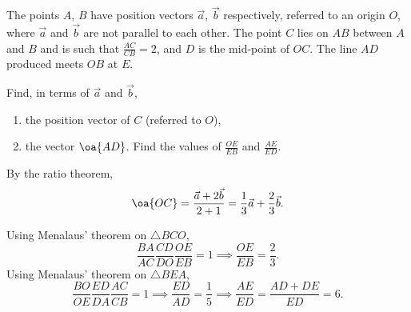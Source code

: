 \begin{problem}
    The points $A$, $B$ have position vectors $\vec a$, $\vec b$ respectively, referred to an origin $O$, where $\vec a$ and $\vec b$ are not parallel to each other. The point $C$ lies on $AB$ between $A$ and $B$ and is such that $\frac{AC}{CB} = 2$, and $D$ is the mid-point of $OC$. The line $AD$ produced meets $OB$ at $E$.

    Find, in terms of $\vec a$ and $\vec b$,

    \begin{enumerate}
        \item the position vector of $C$ (referred to $O$),
        \item the vector $\oa{AD}$. Find the values of $\frac{OE}{EB}$ and $\frac{AE}{ED}$.
    \end{enumerate}
\end{problem}
\begin{solution}
    \begin{ppart}
        By the ratio theorem, \[\oa{OC} = \frac{\vec a + 2\vec b}{2 + 1} = \frac13 \vec a + \frac23 \vec b.\]
    \end{ppart}
    \begin{ppart}
        Using Menalaus' theorem on $\triangle BCO$, \[\frac{BA}{AC} \frac{CD}{DO} \frac{OE}{EB} = 1 \implies \frac{OE}{EB} = \frac23.\] Using Menalaus' theorem on $\triangle BEA$, \[\frac{BO}{OE} \frac{ED}{DA} \frac{AC}{CB} = 1 \implies \frac{ED}{AD} = \frac15 \implies \frac{AE}{ED} = \frac{AD + DE}{ED} = 6.\]
    \end{ppart}
\end{solution}

